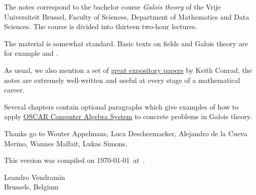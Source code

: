 \preface

The notes correspond to the bachelor 
course \emph{Galois theory} of the 
Vrije Universiteit Brussel, 
Faculty of Sciences, 
Department of Mathematics and Data Sciences. The course
is divided into thirteen two-hour lectures. 

The material is somewhat standard. Basic texts on fields and Galois theory 
are for example \cite{MR1645586} and 
\cite{MR3379917}. 

As usual, we also mention a set of 
\href{https://kconrad.math.uconn.edu/blurbs/}{great expository papers} by 
Keith Conrad, the notes are extremely well-written and useful  
at every stage of a mathematical career. 

Several chapters contain optional paragraphs which give examples of 
how to apply \href{https://oscar.computeralgebra.de/}{OSCAR Computer Algebra System}
to concrete problems in Galois theory. 

 
Thanks go to Wouter Appelmans, Luca Descheemaeker, 
Alejandro de la Cueva Merino, 
Wannes Malfait,
Lukas Simons. 


This version 
was compiled on \today~at~\currenttime.

\bigskip
\begin{flushright}
Leandro Vendramin\\Brussels, Belgium\par
\end{flushright}
